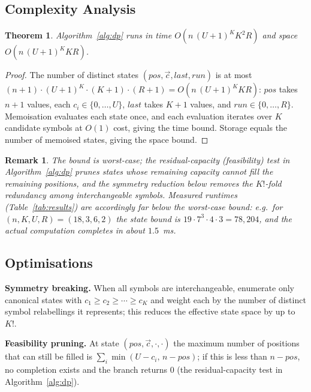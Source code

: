 \documentclass[a4paper,12pt]{article}
\newtheorem{theorem}{Theorem}
\newtheorem{remark}{Remark}
\begin{document}
\subsection{Complexity Analysis}

\begin{theorem}\label{thm:complexity}
Algorithm~\ref{alg:dp} runs in time
$O\!\left(n\,(U+1)^K K^2 R\right)$ and space
$O\!\left(n\,(U+1)^K K R\right)$.
\end{theorem}

\begin{proof}
The number of distinct states $(pos,\vec{c},last,run)$ is at most
$(n+1)\cdot(U+1)^K\cdot(K+1)\cdot(R+1)=O(n\,(U+1)^K K R)$: $pos$ takes
$n+1$ values, each $c_i\in\{0,\ldots,U\}$, $last$ takes $K+1$ values,
and $run\in\{0,\ldots,R\}$.  Memoisation evaluates each state once, and
each evaluation iterates over $K$ candidate symbols at $O(1)$ cost,
giving the time bound.  Storage equals the number of memoised states,
giving the space bound.
\end{proof}

\begin{remark}
The bound is worst-case; the residual-capacity (feasibility) test in
Algorithm~\ref{alg:dp} prunes states whose remaining capacity cannot
fill the remaining positions, and the
symmetry reduction below removes the $K!$-fold redundancy among
interchangeable symbols.  Measured runtimes
(Table~\ref{tab:results}) are accordingly far below the worst-case
bound: e.g.\ for $(n,K,U,R)=(18,3,6,2)$ the state bound is
$19\cdot7^3\cdot4\cdot3=78{,}204$, and the actual computation completes
in about $1.5$~ms.
\end{remark}

\subsection{Optimisations}
\label{sec:optimisations}

\textbf{Symmetry breaking.}
When all symbols are interchangeable, enumerate only canonical states
with $c_1\ge c_2\ge\cdots\ge c_K$ and weight each by the number of
distinct symbol relabellings it represents; this reduces the effective
state space by up to $K!$.

\textbf{Feasibility pruning.}
At state $(pos,\vec{c},\cdot,\cdot)$ the maximum number of positions
that can still be filled is $\sum_i\min(U-c_i,\,n-pos)$; if this is
less than $n-pos$, no completion exists and the branch returns $0$
(the residual-capacity test in Algorithm~\ref{alg:dp}).
\end{document}
